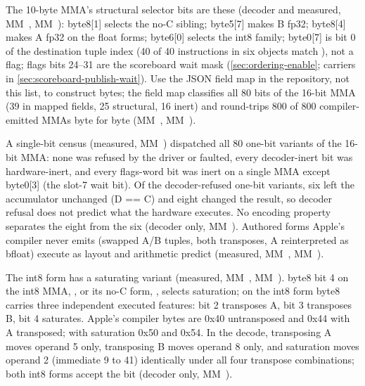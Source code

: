 The 10-byte MMA's structural selector bits are these (decoder and measured, MM~, MM~): byte8{[}1{]} selects the no-C
sibling; byte5{[}7{]} makes B fp32; byte8{[}4{]} makes A fp32 on the float forms; byte6{[}0{]} selects the int8 family; byte0{[}7{]}
is bit 0 of the destination tuple index (40 of 40 instructions in six objects match ), not a flag;
flags bits 24–31 are the scoreboard wait mask (\cref{sec:ordering-enable}; carriers in \cref{sec:scoreboard-publish-wait}). Use the JSON field map in the repository, not this list,
to construct bytes; the field map classifies all 80 bits of the 16-bit MMA (39 in mapped fields, 25 structural, 16 inert) and
 round-trips 800 of 800 compiler-emitted MMAs byte for byte (MM~, MM~).

A single-bit census (measured, MM~) dispatched all 80 one-bit variants of the 16-bit MMA: none was
refused by the driver or faulted, every decoder-inert bit was hardware-inert, and every flags-word bit was inert on a
single MMA except byte0{[}3{]} (the slot-7 wait bit). Of the decoder-refused one-bit variants, six left the accumulator
unchanged (D == C) and eight changed the result, so decoder refusal does not predict what the hardware executes. No encoding property
separates the eight from the six (decoder only, MM~). Authored forms Apple's compiler never emits (swapped A/B
tuples, both transposes, A reinterpreted as bfloat) execute as layout and arithmetic predict (measured, MM~, MM~).

The int8 form has a saturating variant (measured, MM~, MM~). byte8 bit 4 on the int8 MMA, , or its no-C form, , selects saturation; on
the int8 form byte8 carries three independent executed features: bit 2 transposes A, bit 3 transposes B, bit 4
saturates. Apple's compiler bytes are 0x40 untransposed and 0x44 with A transposed; with saturation 0x50 and 0x54. In
the decode, transposing A moves operand 5 only, transposing B moves operand 8 only, and saturation moves operand 2
(immediate 9 to 41) identically under all four transpose combinations; both int8 forms accept the bit (decoder only,
MM~).

